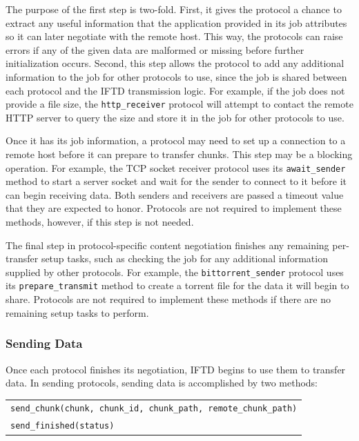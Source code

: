 The purpose of the first step is two-fold.  First, it gives the protocol a chance to extract any useful information that the application provided in its job attributes so it can later negotiate with the remote host.  This way, the protocols can raise errors if any of the given data are malformed or missing before further initialization occurs.  Second, this step allows the protocol to add any additional information to the job for other protocols to use, since the job is shared between each protocol and the IFTD transmission logic.  For example, if the job does not provide a file size, the \texttt{http\_receiver} protocol will attempt to contact the remote HTTP server to query the size and store it in the job for other protocols to use.

Once it has its job information, a protocol may need to set up a connection to a remote host before it can prepare to transfer chunks.  This step may be a blocking operation.  For example, the TCP socket receiver protocol uses its \texttt{await\_sender} method to start a server socket and wait for the sender to connect to it before it can begin receiving data.  Both senders and receivers are passed a timeout value that they are expected to honor.  Protocols are not required to implement these methods, however, if this step is not needed.

The final step in protocol-specific content negotiation finishes any remaining per-transfer setup tasks, such as checking the job for any additional information supplied by other protocols.  For example, the \texttt{bittorrent\_sender} protocol uses its \texttt{prepare\_transmit} method to create a torrent file for the data it will begin to share.  Protocols are not required to implement these methods if there are no remaining setup tasks to perform.

\subsubsection{Sending Data}

Once each protocol finishes its negotiation, IFTD begins to use them to transfer data.  In sending protocols, sending data is accomplished by two methods:

\begin{table}[ht!]
\begin{tabular}{ l }
\indent \texttt{send\_chunk(chunk, chunk\_id, chunk\_path, remote\_chunk\_path)} \\
\indent \texttt{send\_finished(status)} \\
\end{tabular}
\end{table}

